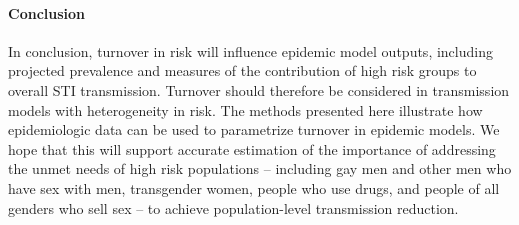 
\paragraph{Conclusion}
In conclusion, turnover in risk will influence
epidemic model outputs, including projected prevalence and
measures of the contribution of high risk groups to overall STI transmission.
Turnover should therefore be considered in
transmission models with heterogeneity in risk.
The methods presented here illustrate how
epidemiologic data can be used to parametrize
turnover in epidemic models.
We hope that this will support accurate estimation of
the importance of addressing the unmet needs of high risk populations
-- including
gay men and other men who have sex with men,
transgender women,
people who use drugs, and
people of all genders who sell sex
-- to achieve population-level transmission reduction.
